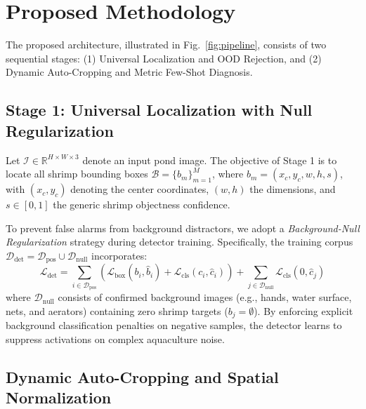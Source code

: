 \documentclass[conference]{IEEEtran}
\begin{document}
\section{Proposed Methodology}

The proposed architecture, illustrated in Fig.~\ref{fig:pipeline}, consists of two sequential stages: (1) Universal Localization and OOD Rejection, and (2) Dynamic Auto-Cropping and Metric Few-Shot Diagnosis.

\subsection{Stage 1: Universal Localization with Null Regularization}

Let $\mathcal{I} \in \mathbb{R}^{H \times W \times 3}$ denote an input pond image. The objective of Stage 1 is to locate all shrimp bounding boxes $\mathcal{B} = \{b_m\}_{m=1}^M$, where $b_m = (x_c, y_c, w, h, s)$, with $(x_c, y_c)$ denoting the center coordinates, $(w, h)$ the dimensions, and $s \in [0, 1]$ the generic shrimp objectness confidence.

To prevent false alarms from background distractors, we adopt a \textit{Background-Null Regularization} strategy during detector training. Specifically, the training corpus $\mathcal{D}_{\text{det}} = \mathcal{D}_{\text{pos}} \cup \mathcal{D}_{\text{null}}$ incorporates:
\begin{equation}
\mathcal{L}_{\text{det}} = \sum_{i \in \mathcal{D}_{\text{pos}}} \left( \mathcal{L}_{\text{box}}(b_i, \hat{b}_i) + \mathcal{L}_{\text{cls}}(c_i, \hat{c}_i) \right) + \sum_{j \in \mathcal{D}_{\text{null}}} \mathcal{L}_{\text{cls}}(0, \hat{c}_j)
\end{equation}
where $\mathcal{D}_{\text{null}}$ consists of confirmed background images (e.g., hands, water surface, nets, and aerators) containing zero shrimp targets ($b_j = \emptyset$). By enforcing explicit background classification penalties on negative samples, the detector learns to suppress activations on complex aquaculture noise.

\subsection{Dynamic Auto-Cropping and Spatial Normalization}
\end{document}
